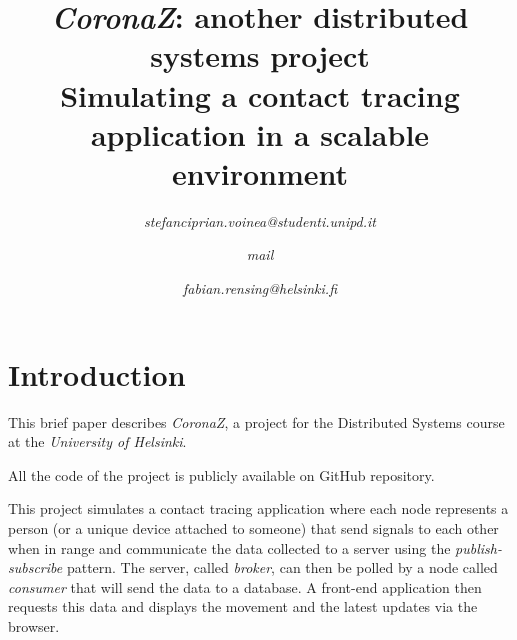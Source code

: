 \documentclass[conference]{IEEEtran}
\begin{document}
\title{\textit{CoronaZ}: another distributed systems project
\\{\Large Simulating a contact tracing application in a scalable environment}
}

\author{
	
	\textit{stefanciprian.voinea@studenti.unipd.it}
	\and
	\textit{mail}
	\and
	\textit{fabian.rensing@helsinki.fi}
}

\maketitle
\thispagestyle{plain}
\pagestyle{plain}



\section{Introduction}\label{sec:introduction}

	This brief paper describes \textit{CoronaZ}, a project for the Distributed Systems course at the \textit{University of Helsinki}.
	
	All the code of the project is publicly available on GitHub repository\cite{coronaz_repo}.
	
	This project simulates a contact tracing application where each node represents a person (or a unique device attached to someone) that send signals to each other when in range and communicate the data collected to a server using the \textit{publish-subscribe} pattern.
	The server, called \textit{broker}, can then be polled by a node called \textit{consumer} that will send the data to a database.
	A front-end application then requests this data and displays the movement and the latest updates via the browser.
	
\end{document}
